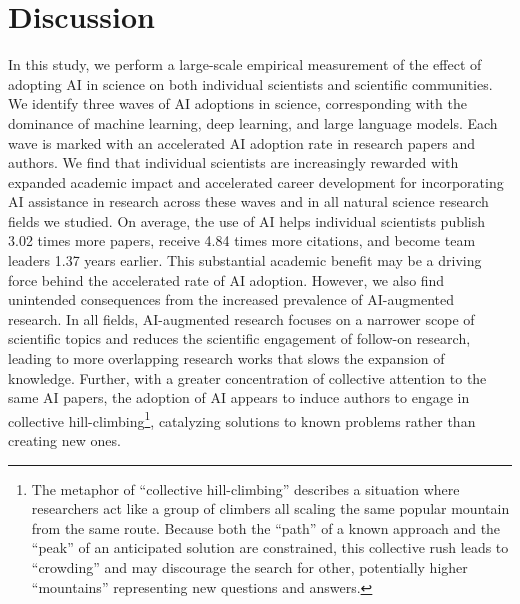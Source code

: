 \section*{Discussion}
In this study, we perform a large-scale empirical measurement of the effect of adopting AI in science on both individual scientists and scientific communities. We identify three waves of AI adoptions in science, corresponding with the dominance of machine learning, deep learning, and large language models. Each wave is marked with an accelerated AI adoption rate in research papers and authors.
We find that individual scientists are increasingly rewarded with expanded academic impact and accelerated career development for incorporating AI assistance in research across these waves and in all natural science research fields we studied.
On average, the use of AI helps individual scientists publish 3.02 times more papers, receive 4.84 times more citations, and become team leaders 1.37 years earlier. This substantial academic benefit may be a driving force behind the accelerated rate of AI adoption.
However, we also find unintended consequences from the increased prevalence of AI-augmented research.
In all fields, AI-augmented research focuses on a narrower scope of scientific topics and reduces the scientific engagement of follow-on research, leading to more overlapping research works that slows the expansion of knowledge.
Further, with a greater concentration of collective attention to the same AI papers, the adoption of AI appears to induce authors to engage in collective hill-climbing\footnote{The metaphor of “collective hill-climbing” describes a situation where researchers act like a group of climbers all scaling the same popular mountain from the same route. Because both the “path” of a known approach and the “peak” of an anticipated solution are constrained, this collective rush leads to “crowding” and may discourage the search for other, potentially higher “mountains” representing new questions and answers.}, catalyzing solutions to known problems rather than creating new ones.

